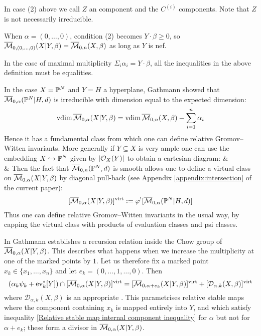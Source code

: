 \begin{remark} In case (2) above we call $Z$ an  component and the $C^{(i)}$  components. Note that $Z$ is not necessarily irreducible. \end{remark}

\begin{remark} When $\alpha = (0, \ldots, 0)$, condition (2) becomes $Y \cdot \beta \geq 0$, so $\overline{\mathcal{M}}_{0,(0,\ldots,0)}(X|Y,\beta) = \overline{\mathcal{M}}_{0,n}(X,\beta)$ as long as $Y$ is nef.\end{remark}

\begin{remark} In the case of maximal multiplicity $\Sigma_{i} \alpha_i = Y \cdot \beta$, all the inequalities in the above definition must be equalities. \end{remark}

In the case $X=\mathbb P^N$ and $Y=H$ a hyperplane, Gathmann showed \cite[Proposition 1.14]{Ga} that $\overline{\mathcal{M}}_{0,\alpha}(\mathbb P^N|H,d)$ is irreducible with dimension equal to the expected dimension:
\begin{equation*} \operatorname{vdim} \overline{\mathcal{M}}_{0,\alpha}(X|Y,\beta) = \operatorname{vdim}{\overline{\mathcal{M}}_{0,n}(X,\beta)} - \sum_{i=1}^n \alpha_i \end{equation*}
Hence it has a fundamental class from which one can define relative Gromov--Witten invariants.
More generally if $Y \subseteq X$ is very ample one can use the embedding $X \hookrightarrow \mathbb P^N$ given by $|\mathcal{O}_X(Y)|$ to obtain a cartesian diagram:
\bcd
{} \ar[r] \ar[d]  &  \ar[d] \\
 \ar[r,"\varphi"] & 
\ecd
Then the fact that $\overline{\mathcal{M}}_{0,n}(\mathbb P^N,d)$ is smooth allows one to define a virtual class on $\overline{\mathcal{M}}_{0,\alpha}(X|Y,\beta)$ by diagonal pull-back (see Appendix \ref{appendix:intersection} of the current paper):
\begin{equation*} [\overline{\mathcal{M}}_{0,\alpha}(X|Y,\beta)]^{\operatorname{virt}} := \varphi^! [\overline{\mathcal{M}}_{0,\alpha}(\mathbb P^N|H,d)] \end{equation*}
Thus one can define relative Gromov--Witten invariants in the usual way, by capping the virtual class with products of evaluation classes and psi classes.

In \cite[\S\S 2-4]{Ga} Gathmann establishes a recursion relation inside the Chow group of $\overline{\mathcal{M}}_{0,\alpha}(X|Y,\beta)$. This describes what happens when we increase the multiplicity at one of the marked points by $1$. Let us therefore fix a marked point $x_k \in \{ x_1, \ldots, x_n \}$ and let $e_k = (0,\ldots,1,\ldots,0)$. Then
\begin{equation*} (\alpha_k \psi_k + \operatorname{ev}_k^* [Y]) \cap [\overline{\mathcal{M}}_{0,\alpha}(X|Y,\beta)]^{\operatorname{virt}} = [\overline{\mathcal{M}}_{0,\alpha+e_k}(X|Y,\beta)]^{\operatorname{virt}} + [\mathcal{D}_{\alpha,k}(X,\beta)]^{\operatorname{virt}} \end{equation*}
where $\mathcal{D}_{\alpha,k}(X,\beta)$ is an appropriate . This parametrises relative stable maps where the component containing $x_k$ is mapped entirely into $Y$, and which satisfy inequality \eqref{Relative stable map internal component inequality} for $\alpha$ but not for $\alpha+e_k$; these form a divisor in $\overline{\mathcal{M}}_{0,\alpha}(X|Y,\beta)$.

